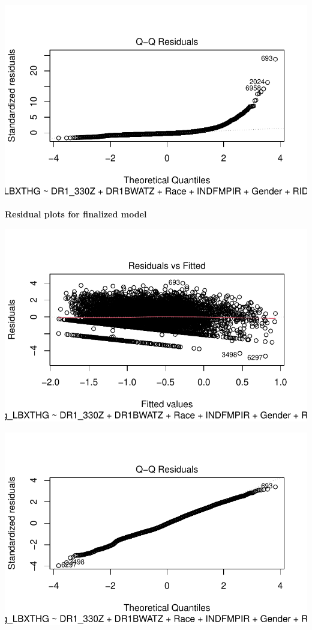 \documentclass[
  letterpaper,
  DIV=11,
  numbers=noendperiod]{scrartcl}
\begin{document}
\includegraphics{_IDS702_Final_Report_Feedback_files/figure-pdf/unnamed-chunk-18-2.pdf}

\textbf{Residual plots for finalized model}

\includegraphics{_IDS702_Final_Report_Feedback_files/figure-pdf/unnamed-chunk-19-1.pdf}

\includegraphics{_IDS702_Final_Report_Feedback_files/figure-pdf/unnamed-chunk-19-2.pdf}
\end{document}
